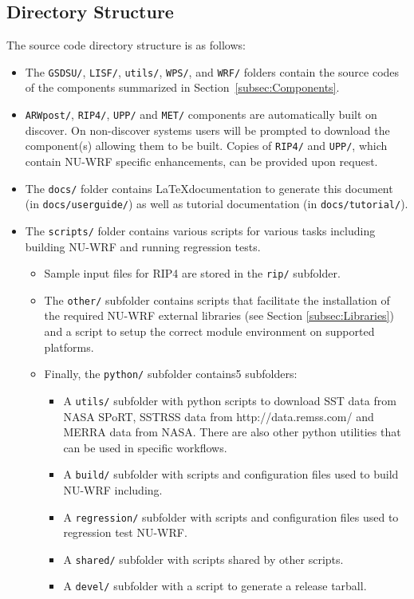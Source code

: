 \subsection{Directory Structure}

The source code directory structure is as follows:

\begin{itemize}
  \item The \texttt{GSDSU/}, \texttt{LISF/}, \texttt{utils/}, 
    \texttt{WPS/}, and \texttt{WRF/} folders contain the source codes of the
    components summarized in Section~\ref{subsec:Components}.
    
  \item \texttt{ARWpost/}, \texttt{RIP4/}, \texttt{UPP/} and \texttt{MET/} components are automatically built on discover. On non-discover systems users will be prompted to download the component(s) allowing them to be built. Copies of \texttt{RIP4/} and \texttt{UPP/}, which contain
    NU-WRF specific enhancements, can be provided upon request.
    
  \item The \texttt{docs/} folder contains \LaTeX documentation to generate this document 
  (in \texttt{docs/userguide/}) as well as tutorial documentation (in \texttt{docs/tutorial/}).
    
  \item The \texttt{scripts/} folder contains various scripts for various tasks including
    building NU-WRF and running regression tests.
    
    \begin{itemize}
    \item Sample input files for RIP4 are stored in the \texttt{rip/} subfolder.  
    \item The \texttt{other/} subfolder contains scripts that facilitate the installation of the required NU-WRF external libraries (see Section \ref{subsec:Libraries}) and a script to setup the correct module environment on supported platforms. 
    \item Finally, the  \texttt{python/} subfolder contains5 subfolders:
      
    \begin{itemize}
    \item  A \texttt{utils/} subfolder with python scripts to download SST data from NASA SPoRT, SSTRSS data from http://data.remss.com/ and MERRA data from NASA.  There are also other python utilities that can be used in specific workflows. 
    \item A \texttt{build/} subfolder with scripts and configuration files used to build NU-WRF 
    including. 
    \item  A \texttt{regression/} subfolder with scripts and configuration files used to regression test NU-WRF.
    \item A \texttt{shared/} subfolder with scripts shared by other scripts. 
    \item A \texttt{devel/} subfolder with a script to generate a release tarball.
    \end{itemize}
    

\end{itemize}
\end{itemize}
